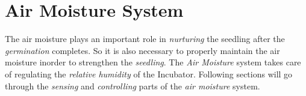 \documentclass[../main]{subfiles}
\begin{document}
\chapter{Air Moisture System} \label{chp:}

The air moisture plays an important role in \emph{nurturing} the seedling after the \emph{germination}
completes. So it is also necessary to properly maintain the air moisture inorder to strengthen the
\emph{seedling}. The \emph{Air Moisture} system takes care of regulating the \emph{relative humidity} of the Incubator.
Following sections will go through the \emph{sensing} and \emph{controlling} parts of the \emph{air moisture}
system.




\end{document}
